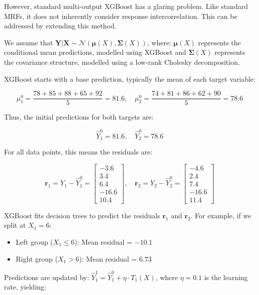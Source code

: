\noindent However, standard multi-output XGBoost has a glaring problem. Like standard MRFs, it does not inherently consider response intercorrelation. This can be addressed by extending this method.


\noindent We assume that \( \mathbf{Y} | \mathbf{X} \sim \mathcal{N}(\mathbf{\mu}(X), \mathbf{\Sigma}(X)) \), where: \( \mathbf{\mu}(X) \) represents the conditional mean predictions, modelled using XGBoost and \( \mathbf{\Sigma}(X) \) represents the covariance structure, modelled using a low-rank Cholesky decomposition.

XGBoost starts with a base prediction, typically the mean of each target variable:

\[
\mu_1^0 = \frac{78 + 85 + 88 + 65 + 92}{5} = 81.6, \quad
\mu_2^0 = \frac{74 + 81 + 86 + 62 + 90}{5} = 78.6
\]

Thus, the initial predictions for both targets are:

\[
\hat{Y}_1^0 = 81.6, \quad \hat{Y}_2^0 = 78.6
\]

For all data points, this means the residuals are:

\[
\mathbf{r}_1 = Y_1 - \hat{Y}_1^0 =
\begin{bmatrix}
-3.6 \\
3.4 \\
6.4 \\
-16.6 \\
10.4
\end{bmatrix},
\quad
\mathbf{r}_2 = Y_2 - \hat{Y}_2^0 =
\begin{bmatrix}
-4.6 \\
2.4 \\
7.4 \\
-16.6 \\
11.4
\end{bmatrix}
\]

\noindent XGBoost fits decision trees to predict the residuals \( \mathbf{r}_1 \) and \( \mathbf{r}_2 \). For example, if we split at \( X_1 = 6 \):

\begin{itemize}
    \item Left group (\( X_1 \leq 6 \)): Mean residual = \( -10.1 \)
    \item Right group (\( X_1 > 6 \)): Mean residual = \( 6.73 \)
\end{itemize}

\noindent Predictions are updated by: $\hat{Y}_1^1 = \hat{Y}_1^0 + \eta \cdot T_1(X)$,
where \( \eta = 0.1 \) is the learning rate, yielding:

